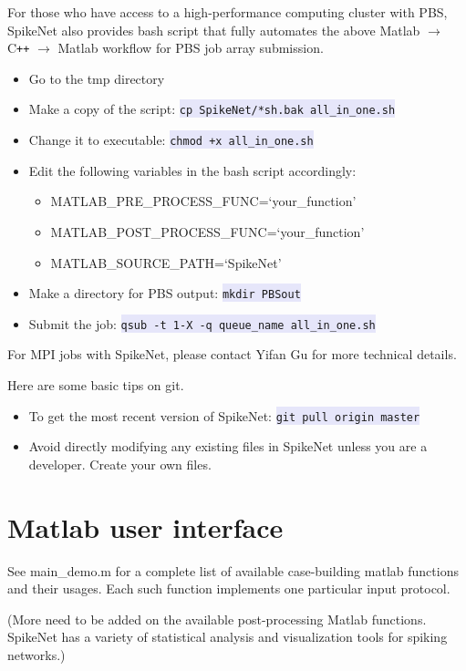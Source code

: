\documentclass{article}
\newcommand{\mylstinline}[1] {\colorbox{Lavender}{\lstinline[basicstyle=\ttfamily\footnotesize\color{Black}]|#1|} }
\begin{document}
For those who have access to a high-performance computing cluster with PBS, SpikeNet also provides bash script that fully automates the above Matlab $\rightarrow$  C\texttt{++}  $\rightarrow$ Matlab workflow for PBS job array submission. 
\begin{itemize}
\item Go to the tmp directory
\item Make a copy of the script: \mylstinline{cp SpikeNet/*sh.bak all_in_one.sh}
\item Change it to executable: \mylstinline{chmod +x all_in_one.sh}
\item Edit the following variables in the bash script accordingly: 
\begin{itemize}
\item {\footnotesize MATLAB\_PRE\_PROCESS\_FUNC=`your\_function'}
\item {\footnotesize MATLAB\_POST\_PROCESS\_FUNC=`your\_function'}
\item {\footnotesize MATLAB\_SOURCE\_PATH=`SpikeNet'}
\end{itemize}
\item Make a directory for PBS output: \mylstinline{mkdir PBSout}
\item Submit the job: \mylstinline{qsub -t 1-X -q queue_name all_in_one.sh}
\end{itemize}
For MPI jobs with SpikeNet, please contact Yifan Gu for more technical details.

Here are some basic tips on git.
\begin{itemize}
\item To get the most recent version of SpikeNet: \mylstinline{git pull origin master}
\item Avoid directly modifying any existing files in SpikeNet unless you are a developer. Create your own files.
\end{itemize} 

\section{Matlab user interface}
\label{sec:matlab user interface}
See main\_demo.m for a complete list of available case-building matlab functions and their usages. Each such function implements one particular input protocol.



(More need to be added on the available post-processing Matlab functions. SpikeNet has a variety of statistical analysis and visualization tools for spiking networks.)
\end{document}
